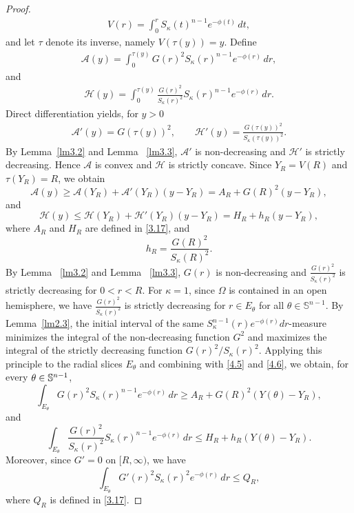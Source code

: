 \documentclass[11pt,leqno]{amsart}
\def\k{\kappa}
\def\S{\Bbb S}
\def\k{\kappa}
\numberwithin{equation}{section}
\begin{document}
\begin{proof}
\begin{align*}
        V(r)=\int_0^r S_{\k}(t)^{n-1}e^{-\phi(t)}\,dt,
\end{align*}
and let  $\tau$ denote its inverse, namely $V(\tau(y))=y$. Define
\begin{align*}
\mathcal A(y)=\int_0^{\tau(y)}G(r)^2S_{\k}(r)^{n-1}e^{-\phi(r)}\,dr,
\end{align*}
and
\begin{align*}
\mathcal H(y)=\int_0^{\tau(y)}\frac{G(r)^2}{S_{\k}(r)^2}S_{\k}(r)^{n-1}e^{-\phi(r)}\,dr.
\end{align*}
Direct differentiation yields, for $y>0$
\begin{align*}
\mathcal A'(y)=G(\tau(y))^2,
\qquad
\mathcal H'(y)=\frac{G(\tau(y))^2}{S_{\k}(\tau(y))^2}.
\end{align*}
By Lemma~\ref{lm3.2} and Lemma ~\ref{lm3.3}, $\mathcal A'$ is non-decreasing and
$\mathcal H'$ is strictly decreasing. Hence $\mathcal A$ is convex and
$\mathcal H$ is strictly concave. Since $Y_R=V(R)$ and $\tau(Y_R)=R$, we obtain
\begin{equation}\label{4.5}
\mathcal A(y)\geq \mathcal A(Y_R) +\mathcal A'(Y_R) (y-Y_R) = A_R+G(R)^2(y-Y_R),
\end{equation}
and 
\begin{equation}\label{4.6}
\mathcal H(y)\leq \mathcal H(Y_R)+\mathcal H'(Y_R) (y-Y_R) = H_R+h_R(y-Y_R),
\end{equation}
where $A_R$ and $H_R$ are defined in \eqref{3.17}, and
\begin{equation*}
h_R=\frac{G(R)^2}{S_{\k}(R)^2}.
\end{equation*}
By Lemma ~\ref{lm3.2} and Lemma ~\ref{lm3.3}, $G(r)$ is non-decreasing  and $\frac{G(r)^{2}}{S_{\k}(r)^{2}}$ is strictly decreasing for $0<r<R$. For $\k=1$, since $\Omega$ is contained in an open hemisphere, we have $\frac{G(r)^{2}}{S_{\k}(r)^{2}}$ is strictly decreasing for $r\in E_{\theta}$ for all $\theta\in \mathbb{S}^{n-1}$.
By Lemma~\ref{lm2.3}, the initial interval of the same
$S_{\k}^{n-1}(r)e^{-\phi(r)}dr$-measure minimizes the integral of the non-decreasing
function $G^2$ and maximizes the integral of the strictly decreasing
function $G(r)^2/S_{\k}(r)^2$. Applying this principle to the radial slices $E_\theta$ and combining with \eqref{4.5} and \eqref{4.6}, we obtain, for every $\theta\in\S^{n-1}$,
\begin{equation}\label{4.7}
        \int_{E_\theta}G(r)^2 S_{\k}(r)^{n-1}e^{-\phi(r)}\,dr
        \geq A_R+G(R)^2(Y(\theta)-Y_R),
\end{equation}
and
\begin{equation}\label{4.8}
        \int_{E_\theta}\frac{G(r)^2}{S_{\k}(r)^2}S_{\k}(r)^{n-1}e^{-\phi(r)}\,dr
        \leq H_R+h_R(Y(\theta)-Y_R).
\end{equation}
Moreover, since $G'=0$ on $[R,\infty)$, we have
\begin{equation}\label{4.9}
        \int_{E_\theta}G'(r)^2S_{\k}(r)^2e^{-\phi(r)}\,dr
        \leq Q_R,
\end{equation}
where $Q_R$ is defined in \eqref{3.17}.


\end{proof}
\end{document}
